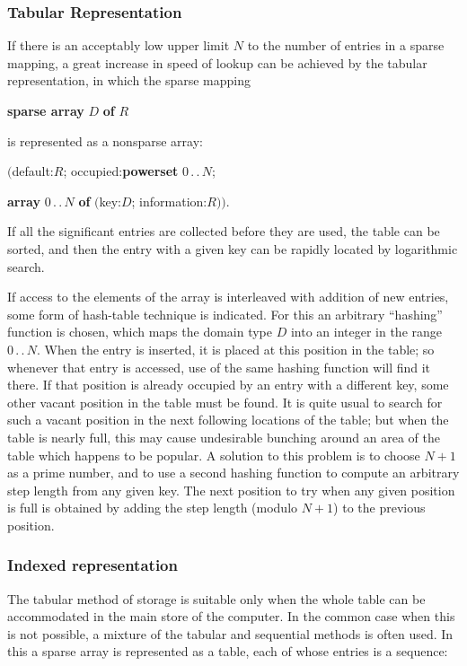 \subsubsection{Tabular Representation}

If there is an acceptably low upper limit $N$ to the number of entries in a sparse mapping, a great increase in speed of lookup can be achieved by the tabular representation, in which the sparse mapping

\quad \textbf{sparse array} $D$ \textbf{of} $R$

\noindent
is represented as a nonsparse array:

\quad $($default:$R$; occupied:\textbf{powerset} $0\,.\,.\,N$;

\tabto*{8em}\textbf{array} $0\,.\,.\,N$ \textbf{of} $($key:$D$; information:$R))$.

\noindent
If all the significant entries are collected before they are used, the table can be sorted, and then the entry with a given key can be rapidly located by logarithmic search.

If access to the elements of the array is interleaved with addition of new entries, some form of hash-table technique is indicated. For this an arbitrary ``hashing'' function is chosen, which maps the domain type $D$ into an integer in the range $0\,.\,.\,N$. When the entry is inserted, it is placed at this position in the table; so whenever that entry is accessed, use of the same hashing function will find it there. If that position is already occupied by an entry with a different key, some other vacant position in the table must be found. It is quite usual to search for such a vacant position in the next following locations of the table; but when the table is nearly full, this may cause undesirable bunching around an area of the table which happens to be popular. A solution to this problem is to choose $N + 1$ as a prime number, and to use a second hashing function to compute an arbitrary step length from any given key. The next position to try when any given position is full is obtained by adding the step length (modulo $N + 1$) to the previous position.

\subsubsection{Indexed representation}

The tabular method of storage is suitable only when the whole table can be
accommodated in the main store of the computer. In the common case
when this is not possible, a mixture of the tabular and sequential methods is
often used. In this a sparse array is represented as a table, each of whose
entries is a sequence:


